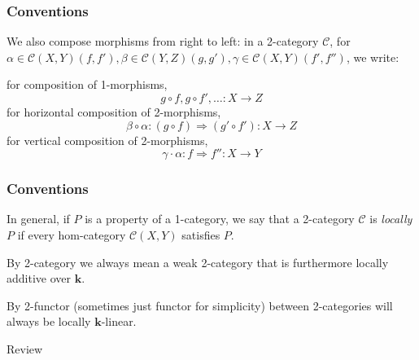 \documentclass{beamer}
\newcommand{\kk}{{\mathbf{k}}}
\newcommand{\cC}{{\mathcal{C}}}
\begin{document}
\begin{frame}
\frametitle{Conventions}
We also compose morphisms from right to left:
in a 2-category $\cC$,
for $\alpha \in \cC(X,Y)(f,f'),
\beta \in \cC(Y,Z)(g,g'),
\gamma \in \cC(X,Y)(f',f'')$,
we write:

for composition of 1-morphisms,
\[
g \circ f, g \circ f', \ldots : X \to Z
\]
for horizontal composition of 2-morphisms,
\[
\beta \circ \alpha: (g \circ f) \Rightarrow (g' \circ f'):
	X \to Z
\]
for vertical composition of 2-morphisms,
\[
\gamma \cdot \alpha: f \Rightarrow f'' : X \to Y
\]

\end{frame}


\begin{frame}
\frametitle{Conventions}
In general, if $P$ is a property of a 1-category,
we say that a 2-category $\cC$ is \emph{locally $P$}
if every hom-category $\cC(X,Y)$ satisfies $P$.

\pause

By 2-category we always mean a weak 2-category
that is furthermore locally additive over $\kk$.

By 2-functor (sometimes just functor for simplicity)
between 2-categories will always be locally $\kk$-linear.

\end{frame}

\begin{frame}

\begin{center}
\Huge Review
\end{center}
\end{frame}
\end{document}

